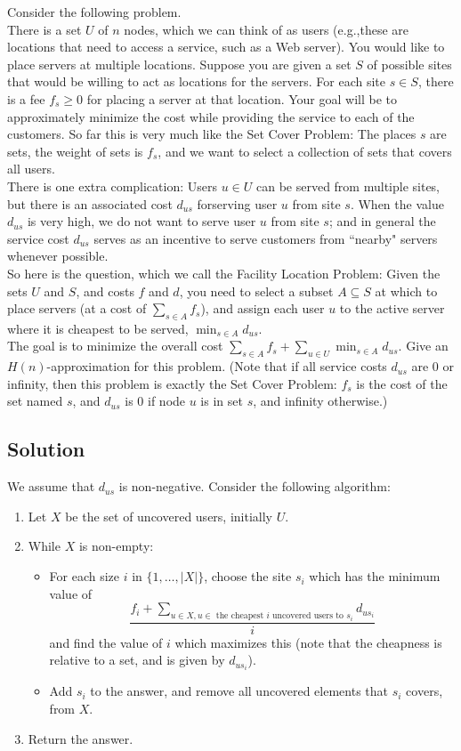 \documentclass[a4paper]{article}
\newcommand{\nl}{\vspace{0.2cm}\\}
\begin{document}
Consider the following problem.\nl
There is a set $U$ of $n$ nodes,  which we can think of as users (e.g.,these are locations that need to access a service, such as a Web server).  You would like to place servers at  multiple
locations.   Suppose  you  are  given  a  set $S$ of  possible  sites  that  would  be  willing  to  act as  locations  for  the  servers.
For  each  site $s \in S$,  there  is  a  fee $f_s \ge 0$  for  placing  a  server  at  that location.
Your  goal  will  be  to  approximately  minimize  the  cost  while  providing  the  service  to  each of  the  customers.   So  far  this  is  very  much  like  the  Set  Cover  Problem:  The  places
$s$ are  sets,  the weight of sets is $f_s$, and we want to select a collection of sets that covers all users.\nl
There is one extra complication:  Users $u \in U$ can be served from multiple sites, but there is an associated cost $d_{us}$ forserving user $u$ from site $s$.  When the value $d_{us}$ is very high,
we do not want to serve user $u$ from site $s$; and in general the service cost $d_{us}$ serves as an incentive to serve customers from ``nearby" servers whenever possible.\nl
So here is the question, which we call the Facility Location Problem:  Given the sets $U$ and $S$, and costs $f$ and $d$, you need to select a subset $A \subseteq S$ at which to place servers (at a
cost of $\sum_{s\in A} f_s$), and assign each user $u$ to the active server where it is cheapest to be served, $\min_{s \in A} d_{us}$.\nl
The goal is to minimize the overall cost $\sum_{s\in A} f_s + \sum_{u \in U} \min_{s \in A} d_{us}$.  Give an $H(n)$-approximation for this problem.
(Note that if all service costs $d_{us}$ are 0 or infinity, then this problem is exactly the Set Cover Problem: $f_s$ is the cost of the set named $s$, and $d_{us}$ is 0 if node $u$ is in set
$s$, and infinity otherwise.)

\subsection{Solution}
We assume that $d_{us}$ is non-negative.
Consider the following algorithm:
\begin{enumerate}
    \item Let $X$ be the set of uncovered users, initially $U$.
    \item While $X$ is non-empty:
        \begin{itemize}
            \item For each size $i$ in $\{1, \ldots, |X|\}$, choose the site $s_i$ which has the minimum value of $$\frac{f_i + \sum_{u \in X, u \in \text{ the cheapest $i$ uncovered users to }s_i}
                d_{us_i}}{i}$$
                and find the value of $i$ which maximizes this (note that the cheapness is relative to a set, and is given by $d_{us_i}$).
            \item Add $s_i$ to the answer, and remove all uncovered elements that $s_i$ covers, from $X$.
        \end{itemize}
    \item Return the answer.
\end{enumerate}
\end{document}

